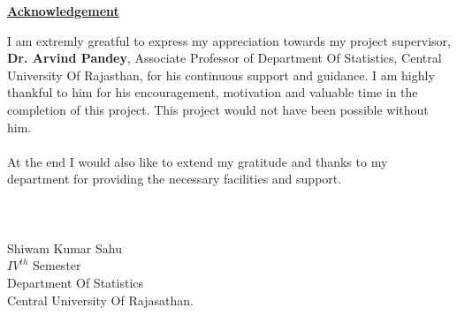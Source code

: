 \documentclass[12pt]{article}
\begin{document}
\newpage
\begin{doublespace}

\begin{center}
\begin{Large}
\underline{\textbf{Acknowledgement}}

\end{Large}
\end{center}I am extremly greatful to express my appreciation towards my project supervisor, \textbf{Dr. Arvind Pandey}, Associate Professor of Department Of Statistics, Central University Of Rajasthan, for his continuous support and guidance. I am highly thankful to him for his encouragement, motivation and valuable time in the completion of this project. This project would not have been possible without him.\\
\\
At the end I would also like to extend my gratitude and thanks to my department for providing the necessary facilities and support.\\
\\
\\
\\
\flushright
Shiwam Kumar Sahu\\
\textit{$IV^{th}$} Semester\\
Department Of Statistics\\
Central University Of Rajasathan.

\end{doublespace}
\end{document}
